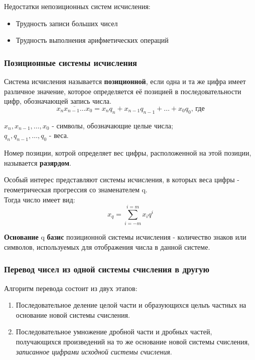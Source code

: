 Недостатки непозиционных систем исчисления:
\begin{itemize}
  \item Трудность записи больших чисел
  \item Трудность выполнения арифметических операций
\end{itemize}

\subsubsection{Позиционные системы исчисления}

\begin{definition}
  Система исчисления называется \textbf{позиционной}, если одна и та же цифра имеет различное значение, которое определяется её позицией в последовательности цифр, обозначающей запись числа.
  \[
    \overline{x_{n} x_{n-1} \ldots x_0} = x_{n} q_{n} + x_{n-1} q_{n-1} + \ldots + x_0 q_0 \text{, где}
  \]
  \begin{center}
    $x_{n}, x_{n-1}, \ldots, x_{0}$ - символы, обозначающие целые числа; \\
    $q_{n}, q_{n-1}, \ldots, q_0$ - веса.
  \end{center}
\end{definition}

\begin{definition}
  Номер позиции, котрой определяет вес цифры, расположенной на этой позиции, называется \textbf{разярдом}.
\end{definition}

Особый интерес представляют системы исчисления, в которых веса цифры - геометрическая прогрессия со знаменателем q. \\
Тогда число имеет вид:
\[
  x_q = \sum_{i=-m}^{i=m} x_i q^i
\] 

\begin{definition}
  \textbf{Основание} q \textbf{базис} позиционной системы исчисления - количество знаков или символов, используемых для отображения числа в данной системе.
\end{definition}


\subsubsection{Перевод чисел из одной системы счисления в другую}

Алгоритм перевода состоит из двух этапов:
\begin{enumerate}
  \item Последовательное деление целой части и образующихся целыъ частных на основание новой системы счисления.
  \item Последовательное умножение дробной части и дробных частей, получающихся произведений на то же основание новой системы счисления, \textit{записанное цифрами исходной системы счисления}. 
\end{enumerate}


